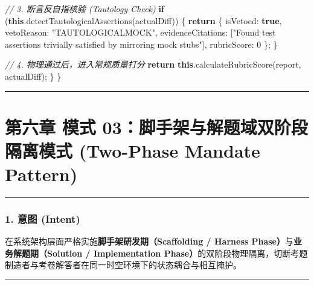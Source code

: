 \documentclass[
]{ctexart}
\newenvironment{Shaded}{}{}
\newcommand{\CommentTok}[1]{\textcolor[rgb]{0.38,0.63,0.69}{\textit{#1}}}
\newcommand{\ControlFlowTok}[1]{\textcolor[rgb]{0.00,0.44,0.13}{\textbf{#1}}}
\newcommand{\DecValTok}[1]{\textcolor[rgb]{0.25,0.63,0.44}{#1}}
\newcommand{\FunctionTok}[1]{\textcolor[rgb]{0.02,0.16,0.49}{#1}}
\newcommand{\KeywordTok}[1]{\textcolor[rgb]{0.00,0.44,0.13}{\textbf{#1}}}
\newcommand{\NormalTok}[1]{#1}
\newcommand{\OperatorTok}[1]{\textcolor[rgb]{0.40,0.40,0.40}{#1}}
\newcommand{\StringTok}[1]{\textcolor[rgb]{0.25,0.44,0.63}{#1}}
\renewcommand{\_}{\discretionary{}{}{\textunderscore}}
\let\oldsection\section
\renewcommand{\section}{\clearpage\oldsection}
\begin{document}
\begin{Shaded}
\begin{Highlighting}[]
    \CommentTok{// 3. 断言反自指核验 (Tautology Check)}
    \ControlFlowTok{if}\NormalTok{ (}\KeywordTok{this}\OperatorTok{.}\FunctionTok{detectTautologicalAssertions}\NormalTok{(actualDiff)) \{}
      \ControlFlowTok{return}\NormalTok{ \{}
\NormalTok{        isVetoed}\OperatorTok{:} \KeywordTok{true}\OperatorTok{,}
\NormalTok{        vetoReason}\OperatorTok{:} \StringTok{"TAUTOLOGICAL\_MOCK"}\OperatorTok{,}
\NormalTok{        evidenceCitations}\OperatorTok{:}\NormalTok{ [}\StringTok{"Found test assertions trivially satisfied by mirroring mock stubs"}\NormalTok{]}\OperatorTok{,}
\NormalTok{        rubricScore}\OperatorTok{:} \DecValTok{0}
\NormalTok{      \}}\OperatorTok{;}
\NormalTok{    \}}

    \CommentTok{// 4. 物理通过后，进入常规质量打分}
    \ControlFlowTok{return} \KeywordTok{this}\OperatorTok{.}\FunctionTok{calculateRubricScore}\NormalTok{(report}\OperatorTok{,}\NormalTok{ actualDiff)}\OperatorTok{;}
\NormalTok{  \}}
\NormalTok{\}}
\end{Highlighting}
\end{Shaded}

\begin{center}\rule{0.5\linewidth}{0.5pt}\end{center}

\section{第六章 模式 03：脚手架与解题域双阶段隔离模式 (Two-Phase Mandate
Pattern)}\label{ux6a21ux5f0f-03ux811aux624bux67b6ux4e0eux89e3ux9898ux57dfux53ccux9636ux6bb5ux9694ux79bbux6a21ux5f0f-two-phase-mandate-pattern}

\begin{center}\rule{0.5\linewidth}{0.5pt}\end{center}

\subsubsection{1. 意图 (Intent)}\label{ux610fux56fe-intent-2}

在系统架构层面严格实施\textbf{脚手架研发期（Scaffolding / Harness
Phase）}与\textbf{业务解题期（Solution / Implementation
Phase）}的双阶段物理隔离，切断考题制造者与考卷解答者在同一时空环境下的状态耦合与相互掩护。

\begin{center}\rule{0.5\linewidth}{0.5pt}\end{center}
\end{document}
